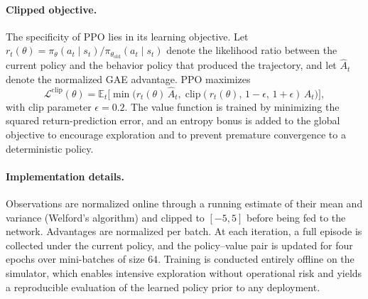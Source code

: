 \paragraph{Clipped objective.}
The specificity of PPO lies in its learning objective. Let $r_t(\theta) = \pi_\theta(a_t \mid s_t) / \pi_{\theta_{\text{old}}}(a_t \mid s_t)$ denote the likelihood ratio between the current policy and the behavior policy that produced the trajectory, and let $\hat{A}_t$ denote the normalized GAE advantage. PPO maximizes
\[
    \mathcal{L}^{\text{clip}}(\theta)
    = \mathbb{E}_t \Big[
        \min \big(r_t(\theta)\, \hat{A}_t,\;
                 \mathrm{clip}(r_t(\theta),\, 1 - \epsilon,\, 1 + \epsilon)\, \hat{A}_t
            \big)
      \Big],
\]
with clip parameter $\epsilon = 0.2$. The value function is trained by minimizing the squared return-prediction error, and an entropy bonus is added to the global objective to encourage exploration and to prevent premature convergence to a deterministic policy.


\paragraph{Implementation details.}
Observations are normalized online through a running estimate of their mean and variance (Welford's algorithm) and clipped to $[-5, 5]$ before being fed to the network. Advantages are normalized per batch. At each iteration, a full episode is collected under the current policy, and the policy--value pair is updated for four epochs over mini-batches of size $64$. Training is conducted entirely offline on the simulator, which enables intensive exploration without operational risk and yields a reproducible evaluation of the learned policy prior to any deployment.